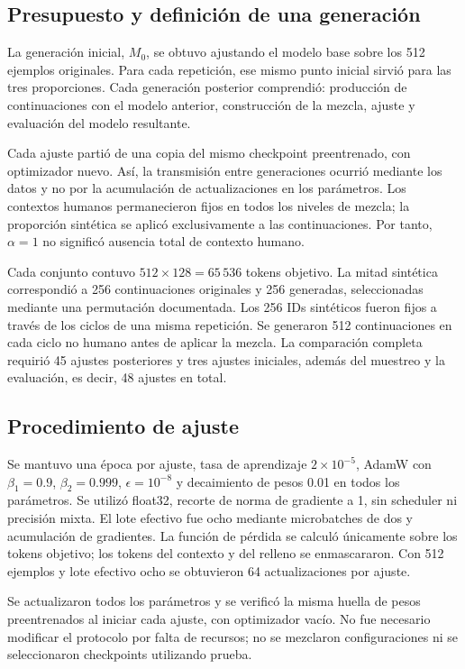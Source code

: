 \documentclass[12pt,letterpaper]{article}
\begin{document}
\subsection{Presupuesto y definición de una generación}

La generación inicial, \(M_0\), se obtuvo ajustando el modelo base sobre
los 512 ejemplos originales. Para cada repetición, ese mismo punto inicial
sirvió para las tres proporciones. Cada generación posterior comprendió:
producción de continuaciones con el modelo anterior, construcción de la
mezcla, ajuste y evaluación del modelo resultante.

Cada ajuste partió de una copia del mismo checkpoint preentrenado, con
optimizador nuevo. Así, la transmisión entre generaciones ocurrió mediante
los datos y no por la acumulación de actualizaciones en los parámetros.
Los contextos humanos permanecieron fijos en todos los niveles de mezcla;
la proporción sintética se aplicó exclusivamente a las continuaciones.
Por tanto, \(\alpha=1\) no significó ausencia total de contexto humano.

Cada conjunto contuvo \(512\times128=65\,536\) tokens objetivo. La mitad
sintética correspondió a 256 continuaciones originales y 256 generadas,
seleccionadas mediante una permutación documentada. Los 256 IDs sintéticos
fueron fijos a través de los ciclos de una misma repetición. Se generaron
512 continuaciones en cada ciclo no humano antes de aplicar la mezcla.
La comparación completa
requirió 45 ajustes posteriores y tres ajustes iniciales, además del
muestreo y la evaluación, es decir, 48 ajustes en total.

\subsection{Procedimiento de ajuste}

Se mantuvo una época por ajuste, tasa de aprendizaje \(2\times10^{-5}\),
AdamW con \(\beta_1=0.9\), \(\beta_2=0.999\), \(\epsilon=10^{-8}\)
y decaimiento de pesos 0.01 en todos los parámetros. Se utilizó float32,
recorte de norma de gradiente a 1, sin scheduler ni precisión mixta. El lote
efectivo fue ocho mediante microbatches de dos y acumulación de gradientes.
La función de pérdida se calculó únicamente sobre los tokens objetivo;
los tokens del contexto y del relleno se enmascararon. Con 512 ejemplos y
lote efectivo ocho se obtuvieron 64 actualizaciones por ajuste.

Se actualizaron todos los parámetros y se verificó la misma huella de
pesos preentrenados al iniciar cada ajuste, con optimizador vacío. No fue necesario
modificar el protocolo por falta de recursos; no se mezclaron
configuraciones ni se seleccionaron checkpoints utilizando prueba.
\end{document}
